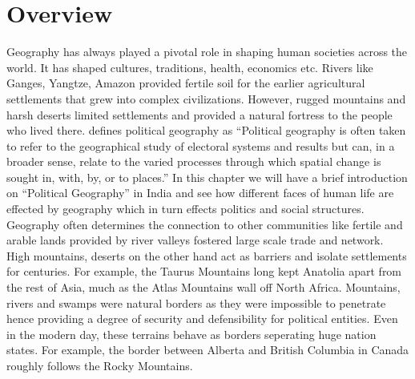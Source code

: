 \section{Overview}
Geography has always played a pivotal role in shaping human societies across the world. It has shaped cultures, traditions, health, economics etc. Rivers like Ganges, Yangtze, Amazon provided fertile soil for the earlier agricultural settlements that grew into complex civilizations. However, rugged mountains and harsh deserts limited settlements and provided a natural fortress to the people who lived there.  \cite{kitchin2009international} defines political geography as ``Political geography is often taken to refer to the geographical study of electoral systems and results but can, in a broader sense, relate to the varied processes through which spatial change is sought in, with, by, or to places.'' In this chapter we will have a brief introduction on ``Political Geography'' in India and see how different faces of human life are effected by geography which in turn effects politics and social structures. Geography often determines the connection to other communities like fertile and arable lands provided by river valleys fostered large scale trade and network. High mountains, deserts on the other hand act as barriers and isolate settlements for centuries. For example, the Taurus Mountains long kept Anatolia apart from the rest of Asia, much as the Atlas Mountains wall off North Africa. Mountains, rivers and swamps were natural borders as they were impossible to penetrate hence providing a degree of security and defensibility for political entities. Even in the modern day, these terrains behave as borders seperating huge nation states. For example, the border between Alberta and British Columbia in Canada roughly follows the Rocky Mountains. 

\vspace{0.3cm}

